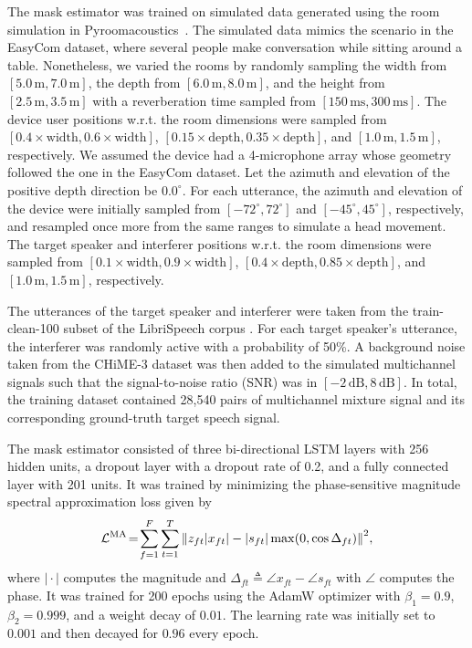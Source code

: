 \documentclass[a4paper]{article}
\begin{document}
The mask estimator was trained on simulated data generated using
the room simulation in Pyroomacoustics~\cite{scheibler_pyroomacoustics_2018}.
The simulated data mimics the scenario in the EasyCom dataset,
where several people make conversation while sitting around a table.
Nonetheless, we varied the rooms by randomly sampling
the width from $[5.0\,\text{m}, 7.0\,\text{m}]$, 
the depth from $[6.0\,\text{m}, 8.0\,\text{m}]$, 
and the height from $[2.5\,\text{m}, 3.5\,\text{m}]$
with a reverberation time sampled from $[150\,\text{ms}, 300\,\text{ms}]$.
The device user positions w.r.t. the room dimensions were sampled from
$[0.4 \!\times\! \text{width}, 0.6 \!\times\! \text{width}]$,
$[0.15 \!\times\! \text{depth}, 0.35 \!\times\! \text{depth}]$, and 
$[1.0\,\text{m}, 1.5\,\text{m}]$, respectively.
We assumed the device had a 4-microphone array
 whose geometry followed the one in the EasyCom dataset.
Let the azimuth and elevation of the positive depth direction be $0.0^\circ$.
For each utterance, the azimuth and elevation of the device were initially sampled from 
$[-72^\circ, 72^\circ]$ and $[-45^\circ, 45^\circ]$, respectively,
and resampled once more from the same ranges to simulate a head movement.
The target speaker and interferer positions w.r.t. the room dimensions were sampled from
$[0.1 \!\times\! \text{width}, 0.9 \!\times\! \text{width}]$,
$[0.4 \!\times\! \text{depth}, 0.85 \!\times\! \text{depth}]$, and 
$[1.0\,\text{m}, 1.5\,\text{m}]$, respectively.

The utterances of the target speaker and interferer were taken 
 from the train-clean-100 subset of the LibriSpeech corpus \cite{panayotov_librispeech_2015}.
For each target speaker's utterance, the interferer was randomly active with a probability of 50\%.
A background noise taken from the CHiME-3 dataset \cite{barker_third_2015} was then added to the simulated multichannel signals such that the signal-to-noise ratio (SNR) was in $[-2\,\text{dB}, 8\,\text{dB}]$.
In total, the training dataset contained 28,540 pairs of
multichannel mixture signal and its corresponding ground-truth target speech signal. 

The mask estimator consisted of three bi-directional LSTM layers with 256 hidden units,
 a dropout layer with a dropout rate of 0.2, 
 and a fully connected layer with 201 units.
It was trained by minimizing
the phase-sensitive magnitude spectral approximation loss \cite{erdogan_phase-sensitive_2015} given by
\begin{align}
  \mathcal{L}^\text{MA} \!=\!
  \sum_{f=1}^F \sum_{t=1}^T
  \norm{z_{ft}|x_{ft}| - |s_{ft}|\max\!\qty(0, \cos \Delta_{ft})}^2,
\end{align}
where
$|\!\cdot\!|$ computes the magnitude and
$\Delta_{ft} \!\triangleq\! \angle x_{ft} \!-\! \angle s_{ft}$
with
$\angle$ computes the phase. 
It was trained for 200 epochs
using the AdamW optimizer \cite{loshchilov_decoupled_2019} with
$\beta_1 \!=\! 0.9$, $\beta_2 \!=\! 0.999$, and a weight decay of $0.01$.
The learning rate was initially set to $0.001$ and then decayed for $0.96$ every epoch.
\end{document}
